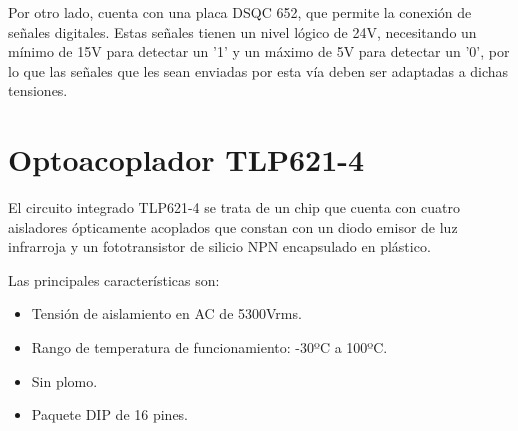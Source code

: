 Por otro lado, cuenta con una placa DSQC 652, que permite la conexión de señales digitales. Estas señales tienen
un nivel lógico de 24V, necesitando un mínimo de 15V para detectar un '1' y un máximo de 5V para detectar un '0',
por lo que las señales que les sean enviadas por esta vía deben ser adaptadas a dichas tensiones.

\section{Optoacoplador TLP621-4}

El circuito integrado TLP621-4 se trata de un chip que cuenta con cuatro aisladores ópticamente acoplados que constan
con un diodo emisor de luz infrarroja y un fototransistor de silicio NPN encapsulado en plástico.

Las principales características son:
\begin{itemize}
    \item Tensión de aislamiento en AC de 5300Vrms.
    \item Rango de temperatura de funcionamiento: -30ºC a 100ºC.
    \item Sin plomo.
    \item Paquete DIP de 16 pines.
\end{itemize}